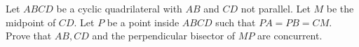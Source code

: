 Let $ABCD$ be a cyclic quadrilateral with $AB$ and $CD$ not parallel. Let $M$ be the midpoint of $CD.$ Let $P$ be a point inside $ABCD$ such that $P A = P B = CM.$ Prove that $AB, CD$ and the perpendicular bisector of $MP$ are concurrent.